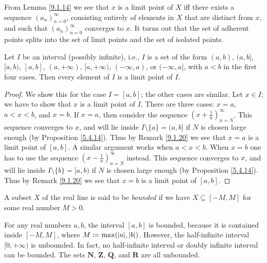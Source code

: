 \setcounter{theorem}{19}
\begin{remark}\label{9.1.20}
    From Lemma \ref{9.1.14} we see that \(x\) is a limit point of \(X\) iff there exists a sequence \((a_n)_{n = 0}^\infty\), consisting entirely of elements in \(X\) that are distinct from \(x\), and such that \((a_n)_{n = 0}^\infty\) converges to \(x\).
    It turns out that the set of adherent points splits into the set of limit points and the set of isolated points.
\end{remark}

\begin{lemma}\label{9.1.21}
    Let \(I\) be an interval (possibly infinite), i.e., \(I\) is a set of the form \((a, b)\), \((a, b]\), \([a, b)\), \([a, b]\), \((a, +\infty)\), \([a, +\infty)\), \((-\infty, a)\), or \((-\infty, a]\), with \(a < b\) in the first four cases.
    Then every element of \(I\) is a limit point of \(I\).
\end{lemma}

\begin{proof}
    We show this for the case \(I = [a, b]\);
    the other cases are similar.
    Let \(x \in I\);
    we have to show that \(x\) is a limit point of \(I\).
    There are three cases: \(x = a\), \(a < x < b\), and \(x = b\).
    If \(x = a\), then consider the sequence \((x + \frac{1}{n})_{n = N}^\infty\).
    This sequence converges to \(x\), and will lie inside \(I \setminus \{a\} = (a, b]\) if \(N\) is chosen large enough (by Proposition \ref{5.4.14}).
    Thus by Remark \ref{9.1.20} we see that \(x = a\) is a limit point of \([a, b]\).
    A similar argument works when \(a < x < b\).
    When \(x = b\) one has to use the sequence \((x - \frac{1}{n})_{n = N}^\infty\) instead.
    This sequence converges to \(x\), and will lie inside \(I \setminus \{b\} = [a, b)\) if \(N\) is chosen large enough (by Proposition \ref{5.4.14}).
    Thus by Remark \ref{9.1.20} we see that \(x = b\) is a limit point of \([a, b]\).
\end{proof}

\begin{definition}\label{9.1.22}
    A subset \(X\) of the real line is said to be \emph{bounded} if we have \(X \subseteq [-M, M]\) for some real number \(M > 0\).
\end{definition}

\begin{example}\label{9.1.23}
    For any real numbers \(a, b\), the interval \([a, b]\) is bounded, because it is contained inside \([-M, M]\), where \(M \coloneqq \max(\abs*{a}, \abs*{b})\).
    However, the half-infinite interval \([0, +\infty)\) is unbounded.
    In fact, no half-infinite interval or doubly infinite interval can be bounded.
    The sets \(\mathbf{N}\), \(\mathbf{Z}\), \(\mathbf{Q}\), and \(\mathbf{R}\) are all unbounded.
\end{example}

